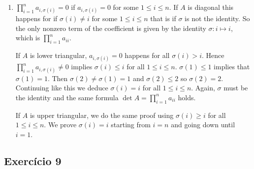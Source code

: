 \begin{enumerate}
  \item $\prod_{i=1}^n a_{i,\sigma(i)} = 0$ if $a_{i,\sigma(i)} = 0$ for some
    $1 \leq i \leq n$. If $A$ is diagonal this happens
    for if $\sigma(i) \neq i$ for some $1 \leq i \leq n$ that is if
    $\sigma$ is not the identity.
    So the only nonzero term of
    the coefficient is given by the identity $\sigma: i \mapsto i$, which is
    $\prod_{i=1}^n a_{ii}$.

    If $A$ is lower triangular, $a_{i,\sigma(i)} = 0$ happens for all
    $\sigma(i) > i$. Hence $\prod_{i=1}^n a_{i,\sigma(i)} \neq 0$ implies
    $\sigma(i) \leq i$ for all $1 \leq i \leq n$.
    $\sigma(1) \leq 1$ implies that $\sigma(1) = 1$.
    Then $\sigma(2) \neq \sigma(1) = 1$ and $\sigma(2) \leq 2$ so
    $\sigma(2) = 2$. Continuing like this we deduce
    $\sigma(i) = i$ for all $1 \leq i \leq n$. Again, $\sigma$ must be the
    identity and the same formula $\det A = \prod_{i=1}^n a_{ii}$ holds.

    If $A$ is upper triangular, we do the same proof using
    $\sigma(i) \geq i$ for all $1 \leq i \leq n$. We prove
    $\sigma(i) = i$ starting from $i=n$ and going down until $i=1$.
\end{enumerate}

\subsection*{Exercício 9}

